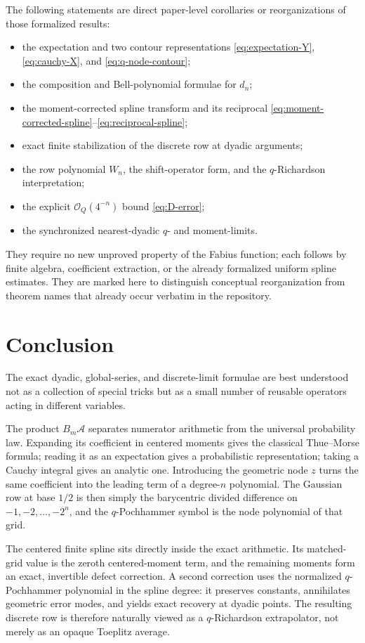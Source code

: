 \documentclass[11pt,oneside]{article}
\theoremstyle{definition}
\theoremstyle{remark}
\newcommand{\bigO}{\mathcal O}
\begin{document}
The following statements are direct paper-level corollaries or reorganizations of those
formalized results:
\begin{itemize}
\item the expectation and two contour representations
      \eqref{eq:expectation-Y}, \eqref{eq:cauchy-X}, and \eqref{eq:q-node-contour};
\item the composition and Bell-polynomial formulae for $d_n$;
\item the moment-corrected spline transform and its reciprocal
      \eqref{eq:moment-corrected-spline}--\eqref{eq:reciprocal-spline};
\item exact finite stabilization of the discrete row at dyadic arguments;
\item the row polynomial $W_n$, the shift-operator form, and the $q$-Richardson interpretation;
\item the explicit $\bigO_Q(4^{-n})$ bound \eqref{eq:D-error};
\item the synchronized nearest-dyadic $q$- and moment-limits.
\end{itemize}
They require no new unproved property of the Fabius function; each follows by finite algebra,
coefficient extraction, or the already formalized uniform spline estimates.  They are marked
here to distinguish conceptual reorganization from theorem names that already occur verbatim
in the repository.

\section{Conclusion}
\label{sec:conclusion}

The exact dyadic, global-series, and discrete-limit formulae are best understood not as a
collection of special tricks but as a small number of reusable operators acting in different
variables.

The product $B_m\mathscr A$ separates numerator arithmetic from the universal probability
law.  Expanding its coefficient in centered moments gives the classical Thue--Morse formula;
reading it as an expectation gives a probabilistic representation; taking a Cauchy integral
gives an analytic one.  Introducing the geometric node $z$ turns the same coefficient into
the leading term of a degree-$n$ polynomial.  The Gaussian row at base $1/2$ is then simply
the barycentric divided difference on $-1,-2,\ldots,-2^n$, and the $q$-Pochhammer symbol is the
node polynomial of that grid.

The centered finite spline sits directly inside the exact arithmetic.  Its matched-grid value
is the zeroth centered-moment term, and the remaining moments form an exact, invertible defect
correction.  A second correction uses the normalized $q$-Pochhammer polynomial in the spline
degree: it preserves constants, annihilates geometric error modes, and yields exact recovery
at dyadic points.  The resulting discrete row is therefore naturally viewed as a
$q$-Richardson extrapolator, not merely as an opaque Toeplitz average.
\end{document}
